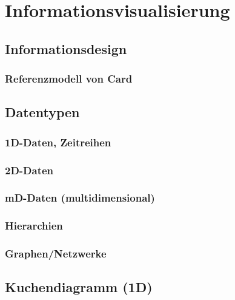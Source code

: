 \documentclass[a4paper, 11pt, accentcolor = tud3b]{tudreport}
\begin{document}
	\chapter{Informationsvisualisierung} %

		\section{Informationsdesign} %

			\subsection{Referenzmodell von Card} %

		\section{Datentypen} %

			\subsection{1D-Daten, Zeitreihen} %

			\subsection{2D-Daten} %

			\subsection{mD-Daten (multidimensional)} %

			\subsection{Hierarchien} %

			\subsection{Graphen/Netzwerke} %

		\section{Kuchendiagramm (1D)} %
\end{document}
